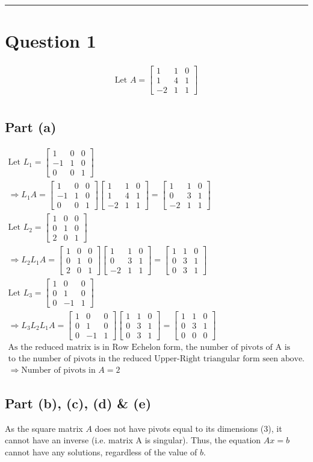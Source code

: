 \documentclass[letterpaper,10pt]{article}
\newcommand{\threematrix}[9]{
	\begin{bmatrix}
		#1 & #4 & #7 \\
		#2 & #5 & #8 \\
		#3 & #6 & #9
	\end{bmatrix}
}
\begin{document}
	 \newline
	 \newline
	 \newline
	\newline \hrule

	\section{Question 1}
		\begin{gather*}
			\text{Let } A = \threematrix{1}{1}{-2}{1}{4}{1}{0}{1}{1} \\
		\end{gather*}

		\subsection{Part (a)}
			\begin{gather*}
				\text{Let } L_1 = \threematrix{1}{-1}{0}{0}{1}{0}{0}{0}{1} \\
				\Rightarrow L_1A = \threematrix{1}{-1}{0}{0}{1}{0}{0}{0}{1} \threematrix{1}{1}{-2}{1}{4}{1}{0}{1}{1} = \threematrix {1}{0}{-2}{1}{3}{1}{0}{1}{1} \\
				\text{Let } L_2 = \threematrix{1}{0}{2}{0}{1}{0}{0}{0}{1} \\
				\Rightarrow L_2 L_1 A = \threematrix{1}{0}{2}{0}{1}{0}{0}{0}{1} \threematrix {1}{0}{-2}{1}{3}{1}{0}{1}{1} = \threematrix{1}{0}{0}{1}{3}{3}{0}{1}{1} \\
				\text{Let } L_3 = \threematrix{1}{0}{0}{0}{1}{-1}{0}{0}{1} \\
				\Rightarrow L_3 L_2 L_1 A = \threematrix{1}{0}{0}{0}{1}{-1}{0}{0}{1} \threematrix{1}{0}{0}{1}{3}{3}{0}{1}{1} = \threematrix{1}{0}{0}{1}{3}{0}{0}{1}{0} \\
				\text{As the reduced matrix is in Row Echelon form, the number of pivots of A is equivalent} \\ \text{to the number of pivots in the reduced Upper-Right triangular form seen above.} \\
				\Rightarrow \text{Number of pivots in } A = 2
			\end{gather*}

		\subsection{Part (b), (c), (d) \& (e)}
			As the square matrix $A$ does not have pivots equal to its dimensions (3), it cannot have an inverse (i.e. matrix A is singular). Thus, the equation $Ax = b$ cannot have any solutions, regardless of the value of $b$.
\end{document}
